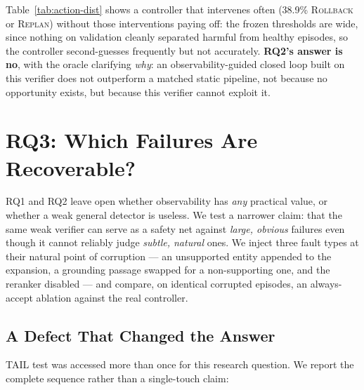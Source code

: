 \documentclass[conference]{IEEEtran}
\begin{document}
Table~\ref{tab:action-dist} shows a controller that intervenes often
(38.9\% \textsc{Rollback} or \textsc{Replan}) without those
interventions paying off: the frozen thresholds are wide, since
nothing on validation cleanly separated harmful from healthy episodes,
so the controller second-guesses frequently but not accurately.
\textbf{RQ2's answer is no}, with the oracle clarifying \emph{why}: an
observability-guided closed loop built on this verifier does not
outperform a matched static pipeline, not because no opportunity
exists, but because this verifier cannot exploit it.

\section{RQ3: Which Failures Are Recoverable?}
\label{sec:rq3}

RQ1 and RQ2 leave open whether observability has \emph{any} practical
value, or whether a weak general detector is useless. We test a
narrower claim: that the same weak verifier can serve as a safety net
against \emph{large, obvious} failures even though it cannot reliably
judge \emph{subtle, natural} ones. We inject three fault types at
their natural point of corruption --- an unsupported entity appended
to the expansion, a grounding passage swapped for a non-supporting
one, and the reranker disabled --- and compare, on identical corrupted
episodes, an always-accept ablation against the real controller.

\subsection{A Defect That Changed the Answer}
\label{sec:defect}

TAIL test was accessed more than once for this research question. We
report the complete sequence rather than a single-touch claim:
\end{document}

